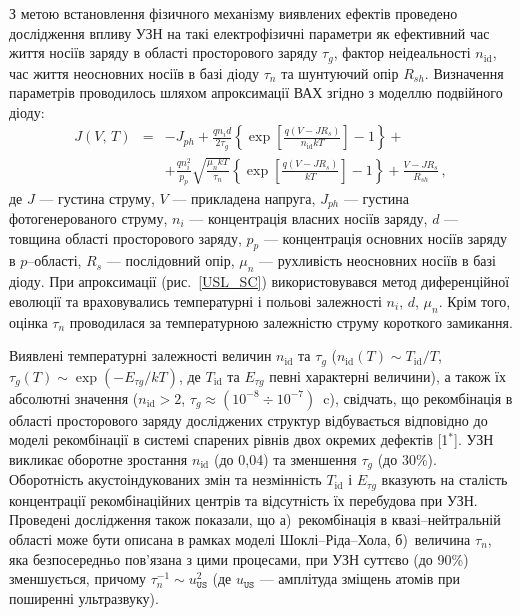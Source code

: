 З метою встановлення фізичного механізму виявлених ефектів проведено дослідження впливу УЗН на такі електрофізичні параметри як
ефективний час життя носіїв заряду в області просторового заряду $\tau_{g}$,
фактор неідеальності $n_\mathrm{id}$,
час життя неосновних носіїв в базі діоду $\tau_n$
та шунтуючий опір $R_{sh}$.
Визначення параметрів проводилось шляхом апроксимації ВАХ згідно з моделлю подвійного діоду:
\begin{eqnarray}
\label{eqSSCIV}
\nonumber J(V,\,T)&=&-J_{ph}+\frac{qn_id}{2\tau_{g}}\left\{\exp \left[\frac{q(V-JR_s)}{n_\mathrm{id}kT}\right]-1\right\}+\\
&&+\frac{qn_i^2}{p_p}\sqrt{\frac{\mu_nkT}{\tau_n}}\left\{\exp \left[\frac{q(V-JR_s)}{kT}\right]-1\right\}+\frac{V-JR_s}{R_{sh}}\,,
\end{eqnarray}
де
$J$ --- густина струму,
$V$ --- прикладена напруга,
$J_{ph}$ --- густина фотогенерованого струму,
$n_i$ --- концентрація власних носіїв заряду,
$d$ --- товщина області просторового заряду,
$p_p$ --- концентрація основних носіїв заряду в $p$--області,
$R_s$ --- послідовний опір,
$\mu_n$ --- рухливість неосновних носіїв в базі діоду.
При апроксимації (рис.~\ref{USL_SC}) використовувався метод диференційної еволюції та враховувались температурні і польові залежності $n_i$, $d$, $\mu_n$.
Крім того, оцінка $\tau_n$ проводилася за температурною залежністю струму короткого замикання.

Виявлені температурні залежності величин $n_\mathrm{id}$ та $\tau_g$
($n_{\mathrm{id}}(T) \sim T_{\mathrm{id}}/T$,
$\tau_{g}(T)\sim\exp\left(-E_{\tau g}/kT\right)$,
де $T_{\mathrm{id}}$ та $E_{\tau g}$ певні характерні величини),
а також їх абсолютні значення ($n_{\mathrm{id}}>2$, $\tau_{g}\approx(10^{-8}\div10^{-7})$~c),
свідчать, що рекомбінація в області просторового заряду досліджених структур
відбувається відповідно до
моделі рекомбінації в системі спарених рівнів двох окремих дефектів
[1$^*$].
УЗН викликає оборотне зростання $n_\mathrm{id}$  (до 0,04) та зменшення $\tau_g$ (до 30\%).
Оборотність акустоіндукованих змін та незмінність $T_{\mathrm{id}}$ і $E_{\tau g}$
вказують на
сталість концентрації рекомбінаційних центрів та відсутність їх перебудова при УЗН.
Проведені дослідження також показали, що
а)~рекомбінація в квазі--нейтральній області може бути описана в рамках моделі Шоклі--Ріда--Хола,
б)~величина $\tau_n$, яка безпосередньо пов'язана з цими процесами,
при УЗН суттєво (до 90\%) зменшується,
причому
$\tau_{n}^{-1}\sim u_\mathtt{US}^2$ (де $u_\mathtt{US}$ --- амплітуда зміщень атомів при поширенні ультразвуку).

